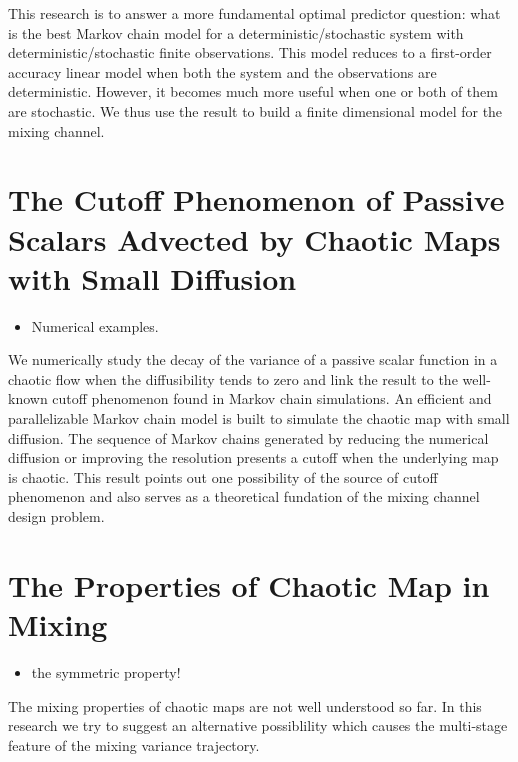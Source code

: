 \documentclass{article}
\begin{document}
This research is to answer a more fundamental optimal predictor question: what is the best Markov chain model for a deterministic/stochastic system with deterministic/stochastic finite observations. This model reduces to a first-order accuracy linear model when both the system and the observations are deterministic. However, it becomes much more useful when one or both of them are stochastic. We thus use the result to build a finite dimensional model for the mixing channel.   

\section{The Cutoff Phenomenon of Passive Scalars Advected by Chaotic Maps with Small Diffusion}

 \begin{itemize}
   \item Numerical examples.
   
 \end{itemize}

We numerically study the decay of the variance of a passive scalar function in a chaotic flow when the diffusibility tends to zero and link the result to the well-known cutoff phenomenon found in Markov chain simulations. An efficient and parallelizable Markov chain model is built to simulate the chaotic map with small diffusion. The sequence of Markov chains generated by reducing the numerical diffusion or improving the resolution presents a cutoff when the underlying map is chaotic. This result points out one possibility of the source of cutoff phenomenon and also serves as a theoretical fundation of the mixing channel design problem.



\section{The Properties of Chaotic Map in Mixing}

 \begin{itemize}
   \item the symmetric property!
 \end{itemize}

The mixing properties of chaotic maps are not well understood so far. In this research we try to suggest an alternative possiblility which causes the multi-stage feature of the mixing variance trajectory.   
\end{document}
